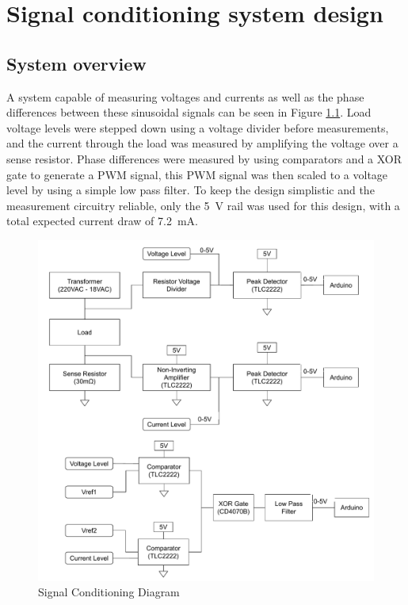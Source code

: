 \chapter{Signal conditioning system design}
\section{System overview} \label{sec:system}
A system capable of measuring voltages and currents as well as the phase differences between these sinusoidal signals can be seen in Figure \ref{fig:system_diagram}. Load voltage levels were stepped down using a voltage divider before measurements, and the current through the load was measured by amplifying the voltage over a sense resistor. Phase differences were measured by using comparators and a XOR gate to generate a PWM signal, this PWM signal was then scaled to a voltage level by using a simple low pass filter. To keep the design simplistic and the measurement circuitry reliable, only the \SI{5}{\volt} rail was used for this design, with a total expected current draw of \SI{7.2}{\milli A}.

\begin{figure}
    \centering
    \includegraphics[width = 0.46\linewidth]{Figures/measurement_diagram.pdf}
    \caption{Signal Conditioning Diagram}
    \label{fig:system_diagram}
\end{figure}









